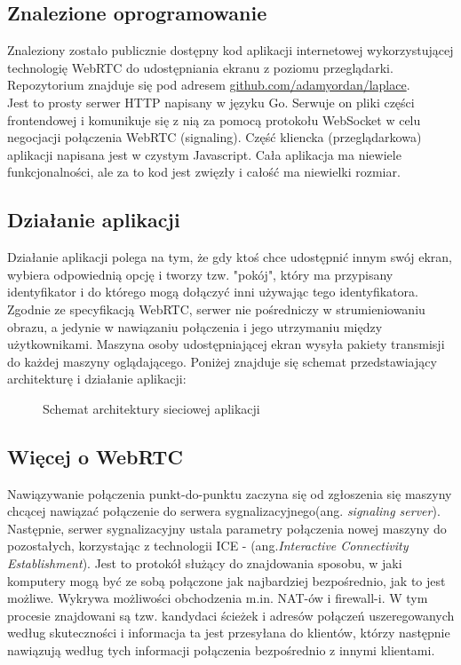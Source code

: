 \documentclass[a4paper,11pt]{article}
\begin{document}
        \subsection{Znalezione oprogramowanie}
        Znaleziony zostało publicznie dostępny kod aplikacji internetowej wykorzystującej technologię WebRTC do udostępniania ekranu z poziomu przeglądarki. \\
        Repozytorium znajduje się pod adresem \url{github.com/adamyordan/laplace}. \\
        Jest to prosty serwer HTTP napisany w języku Go. 
        Serwuje on pliki części frontendowej i komunikuje się z nią za pomocą protokołu WebSocket w celu negocjacji połączenia WebRTC (signaling). 
        Część kliencka (przeglądarkowa) aplikacji napisana jest w czystym Javascript. Cała aplikacja ma niewiele funkcjonalności, ale za to kod jest zwięzły i całość ma niewielki rozmiar.
        \subsection{Działanie aplikacji}
        Działanie aplikacji polega na tym, że gdy ktoś chce udostępnić innym swój ekran, wybiera odpowiednią opcję i tworzy tzw. "pokój", 
        który ma przypisany identyfikator i do którego mogą dołączyć inni używając tego identyfikatora. 
        Zgodnie ze specyfikacją WebRTC, serwer nie pośredniczy w strumieniowaniu obrazu, a jedynie w nawiązaniu połączenia i jego utrzymaniu między użytkownikami.   
        Maszyna osoby udostępniającej ekran wysyła pakiety transmisji do każdej maszyny oglądającego. 
        Poniżej znajduje się schemat przedstawiający architekturę i działanie aplikacji: 
        \begin{figure}[H]
        \centering
        \def\svgwidth{\columnwidth}
        
        \caption{Schemat architektury sieciowej aplikacji}
        \label{rys1:label}
        \end{figure}
        \subsection{Więcej o WebRTC}
        Nawiązywanie połączenia punkt-do-punktu zaczyna się od zgłoszenia się maszyny chcącej nawiązać połączenie do serwera sygnalizacyjnego(ang. \emph{signaling server}).
        Następnie, serwer sygnalizacyjny ustala parametry połączenia nowej maszyny do pozostałych, korzystając z technologii ICE - (ang.\emph{Interactive Connectivity Establishment}).
        Jest to protokół służący do znajdowania sposobu, w jaki komputery mogą być ze sobą połączone jak najbardziej bezpośrednio, jak to jest możliwe. 
        Wykrywa możliwości obchodzenia m.in. NAT-ów i firewall-i. 
        W tym procesie znajdowani są tzw. kandydaci ścieżek i adresów połączeń uszeregowanych według skuteczności i informacja ta jest przesyłana do klientów, 
        którzy następnie nawiązują według tych informacji połączenia bezpośrednio z innymi klientami.  
\end{document}
